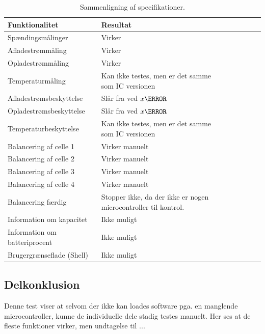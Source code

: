 \begin{table}[h!]
	\small
	\centering
	\begin{threeparttable}
		\begin{tabular}{ l l l l l l l }
			\toprule
			\multicolumn{1}{l}{\textbf{Funktionalitet}}          &
			\multicolumn{1}{l}{\textbf{Resultat}}           \\
			\hline
			Spændingsmålinger              & Virker                         \\
			Afladestrømmåling                    		& Virker                         \\
			Opladestrømmåling                    		& Virker                         \\
			Temperaturmåling                    		& Kan ikke testes, men er det samme som IC versionen    \\
			Afladestrømsbeskyttelse		& Slår fra ved $x\ampere$        \\
			Opladestrømsbeskyttelse   	& Slår fra ved $x\ampere$      \\
			Temperaturbeskyttelse          & Kan ikke testes, men er det samme som IC versionen          \\
			Balancering af celle 1         & Virker manuelt                         \\
			Balancering af celle 2        & Virker manuelt                        \\
			Balancering af celle 3        & Virker manuelt                        \\			
			Balancering af celle 4        & Virker manuelt                        \\
			Balancering færdig             & Stopper ikke, da der ikke er nogen microcontroller til kontrol.               \\
			Information om kapacitet       & Ikke muligt                          \\
			Information om batteriprocent 							& Ikke muligt			 \\
			Brugergrænseflade (Shell)                       & Ikke muligt                    \\
			
			\bottomrule
		\end{tabular}
		\caption{Sammenligning af specifikationer.}
		\label{tab:resultat_diskret}
	\end{threeparttable}
\end{table} 
\FloatBlock

\subsection{Delkonklusion}
Denne test viser at selvom der ikke kan loades software pga. en manglende microcontroller, kunne de individuelle dele stadig testes manuelt. Her ses at de fleste funktioner virker, men undtagelse til ...
